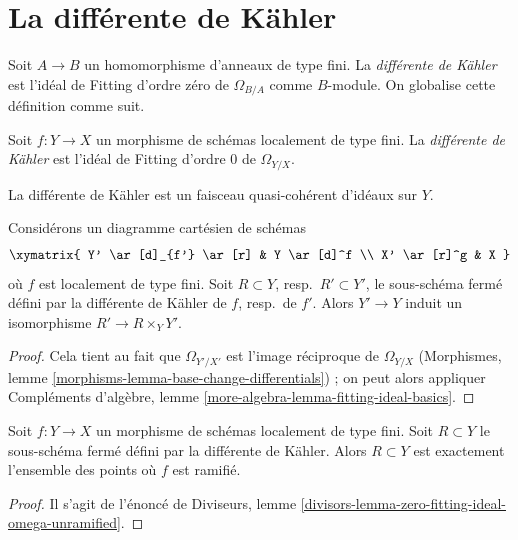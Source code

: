 \section{La différente de Kähler}
\label{section-kahler-different}

\noindent
Soit $A \to B$ un homomorphisme d'anneaux de type fini. La {\it différente de Kähler} est
l'idéal de Fitting d'ordre zéro de $\Omega_{B/A}$ comme $B$-module. On globalise cette
définition comme suit.

\begin{definition}
\label{definition-kahler-different}
Soit $f : Y \to X$ un morphisme de schémas localement de type fini.
La {\it différente de Kähler} est l'idéal de Fitting d'ordre $0$ de $\Omega_{Y/X}$.
\end{definition}

\noindent
La différente de Kähler est un faisceau quasi-cohérent d'idéaux sur $Y$.

\begin{lemma}
\label{lemma-base-change-kahler-different}
Considérons un diagramme cartésien de schémas
$$
\xymatrix{
Y' \ar[d]_{f'} \ar[r] & Y \ar[d]^f \\
X' \ar[r]^g & X
}
$$
où $f$ est localement de type fini. Soit $R \subset Y$, resp.\ $R' \subset Y'$,
le sous-schéma fermé défini par la différente de Kähler de $f$, resp.\ de $f'$.
Alors $Y' \to Y$ induit un isomorphisme $R' \to R \times_Y Y'$.
\end{lemma}

\begin{proof}
Cela tient au fait que $\Omega_{Y'/X'}$ est l'image réciproque de $\Omega_{Y/X}$
(Morphismes, lemme \ref{morphisms-lemma-base-change-differentials}) ;
on peut alors appliquer
Compléments d'algèbre, lemme \ref{more-algebra-lemma-fitting-ideal-basics}.
\end{proof}

\begin{lemma}
\label{lemma-kahler-different}
Soit $f : Y \to X$ un morphisme de schémas localement de type fini.
Soit $R \subset Y$ le sous-schéma fermé défini par
la différente de Kähler. Alors $R \subset Y$ est exactement
l'ensemble des points où $f$ est ramifié.
\end{lemma}

\begin{proof}
Il s'agit de l'énoncé de
Diviseurs, lemme \ref{divisors-lemma-zero-fitting-ideal-omega-unramified}.
\end{proof}

